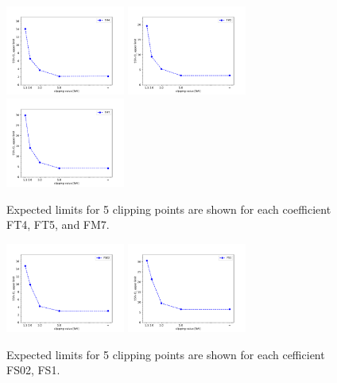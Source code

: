 \begin{figure}[ht]
    \centering
    	\includegraphics[width=0.35\textwidth]{figures/aQGC/ClippedFM4.pdf}
    	\includegraphics[width=0.35\textwidth]{figures/aQGC/ClippedFM5.pdf}
    	\includegraphics[width=0.35\textwidth]{figures/aQGC/ClippedFM7.pdf}
        \caption{Expected limits for 5 clipping points are shown for each coefficient FT4, FT5, and FM7.}
\end{figure}

\begin{figure}[ht]
    \centering
    	\includegraphics[width=0.35\textwidth]{figures/aQGC/ClippedFS02.pdf}
    	\includegraphics[width=0.35\textwidth]{figures/aQGC/ClippedFS1.pdf}
        \caption{Expected limits for 5 clipping points are shown for each cefficient FS02, FS1.}
\end{figure}

